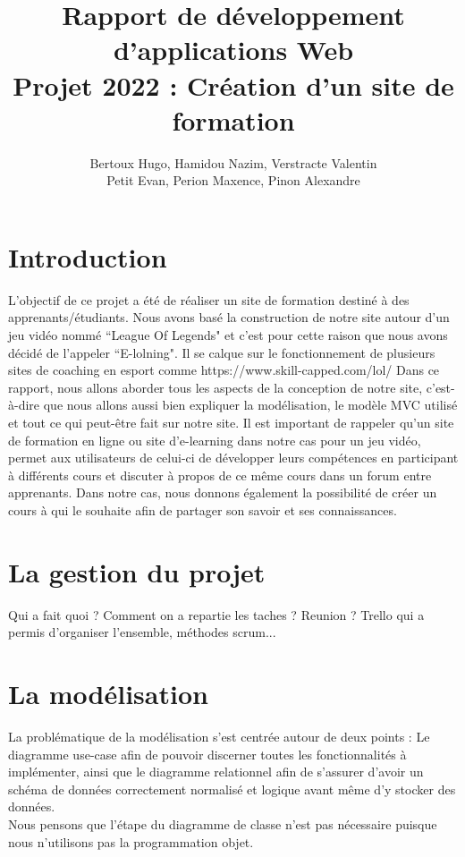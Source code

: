 \documentclass[a4paper,10pt]{article}
\title{
Rapport de développement d'applications Web\\
Projet 2022 : Création d'un site de formation
}
\author{
Bertoux Hugo, Hamidou Nazim, Verstracte Valentin\\
Petit Evan, Perion Maxence, Pinon Alexandre
}
\date{}
\begin{document}
\maketitle 
\tableofcontents

\newpage
\section{Introduction}
L'objectif de ce projet a été de réaliser un site de formation destiné à des apprenants/étudiants. Nous avons basé la construction de notre site autour d'un jeu vidéo nommé ``League Of Legends" et c'est pour cette raison que nous avons décidé de l'appeler ``E-lolning". Il se calque sur le fonctionnement de plusieurs sites de coaching en esport comme https://www.skill-capped.com/lol/ 
Dans ce rapport, nous allons aborder tous les aspects de la conception de notre site, c'est-à-dire que nous allons aussi bien expliquer la modélisation, le modèle MVC utilisé et tout ce qui peut-être fait sur notre site. Il est important de rappeler qu'un site de formation en ligne ou site d'e-learning dans notre cas pour un jeu vidéo, permet aux utilisateurs de celui-ci de développer leurs compétences en participant à différents cours et discuter à propos de ce même cours dans un forum entre apprenants. Dans notre cas, nous donnons également la possibilité de créer un cours à qui le souhaite afin de partager son savoir et ses connaissances. 

\section{La gestion du projet}
Qui a fait quoi ? Comment on a repartie les taches ? Reunion ? Trello qui a permis d'organiser l'ensemble, méthodes scrum...

\section{La modélisation}
La problématique de la modélisation s'est centrée autour de deux points : Le diagramme use-case afin de pouvoir discerner toutes les fonctionnalités à implémenter, ainsi que le diagramme relationnel afin de s'assurer d'avoir un schéma de données correctement normalisé et logique avant même d'y stocker des données.\\
Nous pensons que l'étape du diagramme de classe n'est pas nécessaire puisque nous n'utilisons pas la programmation objet.
\end{document}
